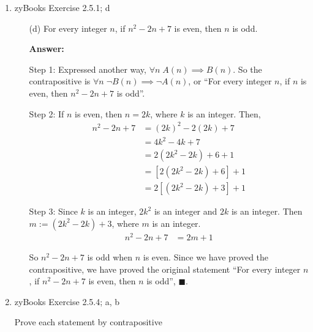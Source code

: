 \documentclass[14pt]{extreport}
\newcommand{\answer}[0]{\medskip \textbf{Answer:} \medskip}
\begin{document}
\begin{enumerate}
    
    \item zyBooks Exercise 2.5.1; d
    
        \begin{enumerate}
            
            \item[(d)] For every integer \( n \), if \( n^2 - 2n + 7 \) is even, then \( n \) is odd. 
            
                \answer

                Step 1: Expressed another way, \( \forall n \; A(n) \implies B(n) \). So the contrapositive is \( \forall n \; \neg B(n) \implies \neg A(n) \), or ``For every integer \( n \), if \( n \) is even, then \( n^2 - 2n + 7 \) is odd''.

                \medskip

                Step 2: If \( n \) is even, then \( n = 2k \), where \( k \) is an integer. Then,
                \begin{align*}
                    n^2 - 2n + 7 &= (2k)^2 - 2(2k) + 7 \\
                                 &= 4k^2 - 4k + 7 \\
                                 &= 2(2k^2 - 2k) + 6 + 1 \\
                                 &= [2(2k^2 - 2k) + 6] + 1 \\
                                 &= 2[(2k^2 - 2k) + 3] + 1
                \end{align*}

                Step 3: Since \( k \) is an integer, \( 2k^2 \) is an integer and \( 2k \) is an integer. Then \( m := (2k^2 - 2k) + 3 \), where \( m \) is an integer.
                \begin{align*}
                    n^2 - 2n + 7 &= 2m + 1
                \end{align*}

                So \( n^2 - 2n + 7 \) is odd when \( n \) is even. Since we have proved the contrapositive, we have proved the original statement ``For every integer \( n \), if \( n^2 - 2n + 7 \) is even, then \( n \) is odd'', \( \blacksquare \).
        \end{enumerate}
    
    \item zyBooks Exercise 2.5.4; a, b
    
    Prove each statement by contrapositive
    

\end{enumerate}
\end{document}
